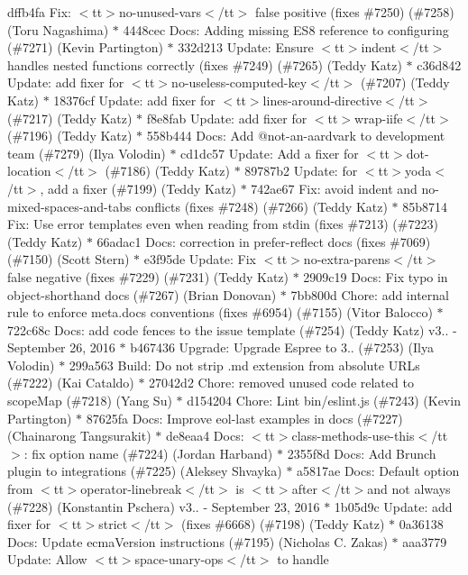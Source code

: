 \begin{DoxyItemize}
dffb4fa Fix\+: $<$tt$>$no-\/unused-\/vars$<$/tt$>$ false positive (fixes \#7250) (\#7258) (\+Toru Nagashima) \texorpdfstring{$\ast$}{*} 4448cec Docs\+: Adding missing ES8 reference to configuring (\#7271) (\+Kevin Partington) \texorpdfstring{$\ast$}{*} 332d213 Update\+: Ensure $<$tt$>$indent$<$/tt$>$ handles nested functions correctly (fixes \#7249) (\#7265) (\+Teddy Katz) \texorpdfstring{$\ast$}{*} c36d842 Update\+: add fixer for $<$tt$>$no-\/useless-\/computed-\/key$<$/tt$>$ (\#7207) (\+Teddy Katz) \texorpdfstring{$\ast$}{*} 18376cf Update\+: add fixer for $<$tt$>$lines-\/around-\/directive$<$/tt$>$ (\#7217) (\+Teddy Katz) \texorpdfstring{$\ast$}{*} f8e8fab Update\+: add fixer for $<$tt$>$wrap-\/iife$<$/tt$>$ (\#7196) (\+Teddy Katz) \texorpdfstring{$\ast$}{*} 558b444 Docs\+: Add @not-\/an-\/aardvark to development team (\#7279) (\+Ilya Volodin) \texorpdfstring{$\ast$}{*} cd1dc57 Update\+: Add a fixer for $<$tt$>$dot-\/location$<$/tt$>$ (\#7186) (\+Teddy Katz) \texorpdfstring{$\ast$}{*} 89787b2 Update\+: for $<$tt$>$yoda$<$/tt$>$, add a fixer (\#7199) (\+Teddy Katz) \texorpdfstring{$\ast$}{*} 742ae67 Fix\+: avoid indent and no-\/mixed-\/spaces-\/and-\/tabs conflicts (fixes \#7248) (\#7266) (\+Teddy Katz) \texorpdfstring{$\ast$}{*} 85b8714 Fix\+: Use error templates even when reading from stdin (fixes \#7213) (\#7223) (\+Teddy Katz) \texorpdfstring{$\ast$}{*} 66adac1 Docs\+: correction in prefer-\/reflect docs (fixes \#7069) (\#7150) (\+Scott Stern) \texorpdfstring{$\ast$}{*} e3f95de Update\+: Fix $<$tt$>$no-\/extra-\/parens$<$/tt$>$ false negative (fixes \#7229) (\#7231) (\+Teddy Katz) \texorpdfstring{$\ast$}{*} 2909c19 Docs\+: Fix typo in object-\/shorthand docs (\#7267) (\+Brian Donovan) \texorpdfstring{$\ast$}{*} 7bb800d Chore\+: add internal rule to enforce meta.\+docs conventions (fixes \#6954) (\#7155) (\+Vitor Balocco) \texorpdfstring{$\ast$}{*} 722c68c Docs\+: add code fences to the issue template (\#7254) (\+Teddy Katz)  v3.. -\/ September 26, 2016  \texorpdfstring{$\ast$}{*} b467436 Upgrade\+: Upgrade Espree to 3.. (\#7253) (\+Ilya Volodin) \texorpdfstring{$\ast$}{*} 299a563 Build\+: Do not strip .\+md extension from absolute URLs (\#7222) (\+Kai Cataldo) \texorpdfstring{$\ast$}{*} 27042d2 Chore\+: removed unused code related to scope\+Map (\#7218) (\+Yang Su) \texorpdfstring{$\ast$}{*} d154204 Chore\+: Lint bin/eslint.\+js (\#7243) (\+Kevin Partington) \texorpdfstring{$\ast$}{*} 87625fa Docs\+: Improve eol-\/last examples in docs (\#7227) (\+Chainarong Tangsurakit) \texorpdfstring{$\ast$}{*} de8eaa4 Docs\+: $<$tt$>$class-\/methods-\/use-\/this$<$/tt$>$\+: fix option name (\#7224) (\+Jordan Harband) \texorpdfstring{$\ast$}{*} 2355f8d Docs\+: Add Brunch plugin to integrations (\#7225) (\+Aleksey Shvayka) \texorpdfstring{$\ast$}{*} a5817ae Docs\+: Default option from $<$tt$>$operator-\/linebreak$<$/tt$>$ is $<$tt$>$after$<$/tt$>$and not always (\#7228) (\+Konstantin Pschera)  v3.. -\/ September 23, 2016  \texorpdfstring{$\ast$}{*} 1b05d9c Update\+: add fixer for $<$tt$>$strict$<$/tt$>$ (fixes \#6668) (\#7198) (\+Teddy Katz) \texorpdfstring{$\ast$}{*} 0a36138 Docs\+: Update ecma\+Version instructions (\#7195) (\+Nicholas C. Zakas) \texorpdfstring{$\ast$}{*} aaa3779 Update\+: Allow $<$tt$>$space-\/unary-\/ops$<$/tt$>$ to handle 
\end{DoxyItemize}
